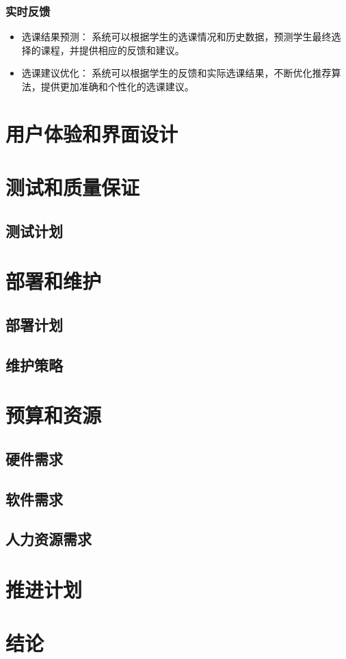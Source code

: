 \documentclass{article}
\begin{document}
\subsubsection{实时反馈}
\begin{itemize}
  \item 选课结果预测： 系统可以根据学生的选课情况和历史数据，预测学生最终选择的课程，并提供相应的反馈和建议。
  \item 选课建议优化： 系统可以根据学生的反馈和实际选课结果，不断优化推荐算法，提供更加准确和个性化的选课建议。
\end{itemize}


\section{用户体验和界面设计}

\section{测试和质量保证}
\subsection{测试计划}
\section{部署和维护}
\subsection{部署计划}
\subsection{维护策略}

\section{预算和资源}
\subsection{硬件需求}
\subsection{软件需求}
\subsection{人力资源需求}

\section{推进计划}

\section{结论}
\end{document}
